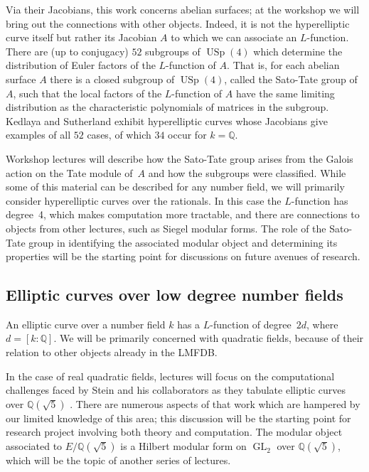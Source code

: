 \documentclass[12pt]{amsart}
\DeclareMathOperator{\GL}{GL}
\DeclareMathOperator{\USp}{USp}
\numberwithin{equation}{section}
\newcommand{\Q}{\mathbb Q}
\begin{document}
Via their Jacobians, this work concerns abelian surfaces; at the
workshop we will bring out the connections with other objects.
Indeed, it is not the hyperelliptic curve itself but rather its
Jacobian $A$ to which we can associate an $L$-function.  There are (up
to conjugacy) $52$ subgroups of $\USp(4)$ which determine the
distribution of Euler factors of the $L$-function of $A$.  That is,
for each abelian surface $A$ there is a closed subgroup of $\USp(4)$,
called the Sato-Tate group of $A$, such that the local factors of the
$L$-function of $A$ have the same limiting distribution as the
characteristic polynomials of matrices in the subgroup.  Kedlaya and
Sutherland exhibit hyperelliptic curves whose Jacobians give examples
of all $52$ cases, of which $34$ occur for $k=\Q$.

Workshop lectures will describe how the Sato-Tate group arises from
the Galois action on the Tate module of~$A$ and how the subgroups were
classified.  While some of this material can be described for any
number field, we will primarily consider hyperelliptic curves over the
rationals.  In this case the $L$-function has degree~4, which makes
computation more tractable, and there are connections to objects from
other lectures, such as Siegel modular forms.  The role of the
Sato-Tate group in identifying the associated modular object and
determining its properties will be the starting point for discussions
on future avenues of research.




\subsection{Elliptic curves over low degree number fields}

An elliptic curve over a number field $k$ has a $L$-function of
degree~$2d$, where $d=[k:\Q]$.  We will be primarily concerned with
quadratic fields, because of their relation to other objects already
in the \textsf{LMFDB}.

In the case of real quadratic fields, lectures will focus on the
computational challenges faced by Stein and his collaborators as they
tabulate elliptic curves over $\Q(\sqrt5)$ \cite{sqrt5first}.  There
are numerous 
aspects of that work which are hampered by our limited knowledge
of this area; this discussion will be the starting point for research
project involving both theory and computation.
%
The modular object associated to $E/\Q(\sqrt5)$ is a Hilbert modular
form on $\GL_2$ over $\Q(\sqrt5)$, which will be the topic of another
series of lectures.
\end{document}
